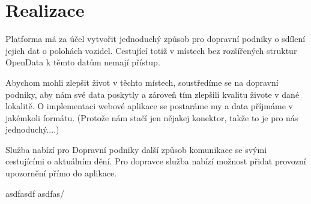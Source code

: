 \chapter{Realizace}
Platforma má za účel vytvořit jednoduchý způsob pro dopravní podniky o sdílení jejich dat o polohách vozidel.
Cestující totiž v místech bez rozšířených struktur OpenData k těmto datům nemají přístup.

Abychom mohli zlepšit život v těchto místech, soustředíme se na dopravní podniky, aby nám své data poskytly a zároveň tím zlepšili kvalitu živote v dané lokalitě.
O implementaci webové aplikace se postaráme my a data příjmáme v jakémkoli formátu. (Protože nám stačí jen nějakej konektor, takže to je pro nás jednoduchý....)

Služba nabízí pro Dopravní podniky další způsob komunikace se svými cestujícími o aktuálním dění. Pro dopravce služba nabízí možnost přidat provozní upozornění přímo do aplikace.


asdfasdf
asdfas/


